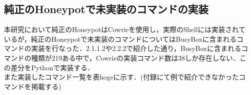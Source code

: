 \subsection{純正のHoneypotで未実装のコマンドの実装}
\label{impl:ImplBusyBox}
本研究において純正のHoneypotはCowrie\cite{cowrie}を使用し，実際のShellには実装されているが，純正のHoneypotで未実装のコマンドについてはBusyBox\cite{busybox}に含まれるコマンドの実装を行なった．2.1.1.2や2.2.2で紹介した通り，BusyBoxに含まれるコマンドの種類が219ある中で，Cowrieの実装コマンド数は38しか存在しない．この差分をPythonで実装する．\\
また実装したコマンド一覧を表hogeに示す．(付録にて例で紹介できなかったコマンドを掲載する)\\



